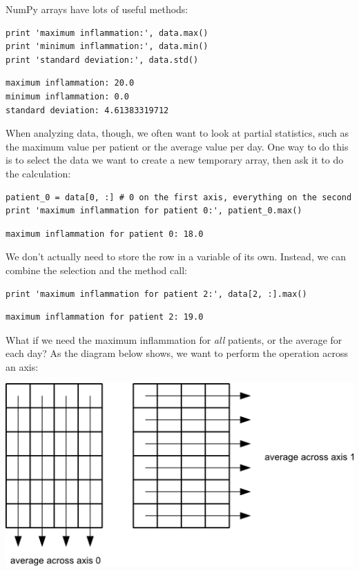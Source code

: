 \documentclass{book}
\begin{document}
NumPy arrays have lots of useful methods:

\begin{verbatim}
print 'maximum inflammation:', data.max()
print 'minimum inflammation:', data.min()
print 'standard deviation:', data.std()
\end{verbatim}

\begin{verbatim}
maximum inflammation: 20.0
minimum inflammation: 0.0
standard deviation: 4.61383319712
\end{verbatim}

When analyzing data, though, we often want to look at partial
statistics, such as the maximum value per patient or the average value
per day. One way to do this is to select the data we want to create a
new temporary array, then ask it to do the calculation:

\begin{verbatim}
patient_0 = data[0, :] # 0 on the first axis, everything on the second
print 'maximum inflammation for patient 0:', patient_0.max()
\end{verbatim}

\begin{verbatim}
maximum inflammation for patient 0: 18.0
\end{verbatim}

We don't actually need to store the row in a variable of its own.
Instead, we can combine the selection and the method call:

\begin{verbatim}
print 'maximum inflammation for patient 2:', data[2, :].max()
\end{verbatim}

\begin{verbatim}
maximum inflammation for patient 2: 19.0
\end{verbatim}

What if we need the maximum inflammation for \emph{all} patients, or the
average for each day? As the diagram below shows, we want to perform the
operation across an axis:

\includegraphics{novice/python/img/python-operations-across-axes.png}
\end{document}
